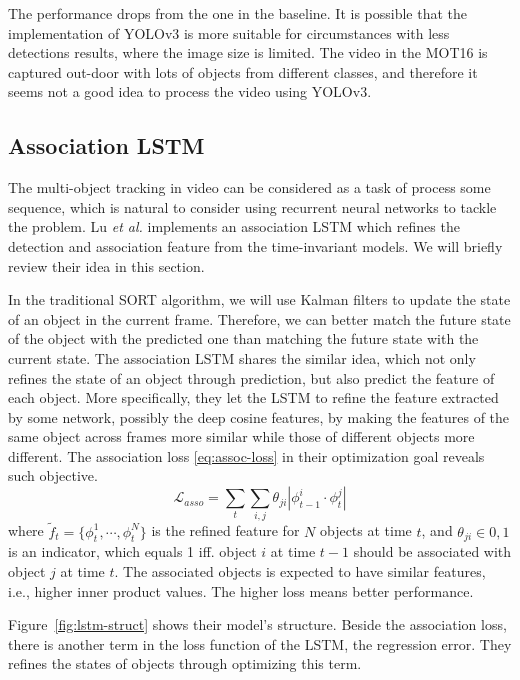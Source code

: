 \documentclass[conference]{IEEEtran}
\begin{document}
The performance drops from the one in the baseline.
It is possible that the implementation of YOLOv3 is more suitable for circumstances with less detections results, where the image size is limited.
The video in the MOT16 is captured out-door with lots of objects from different classes, and therefore it seems not a good idea to process the video using YOLOv3.

\subsection{Association LSTM}
The multi-object tracking in video can be considered as a task of process some sequence, which is natural to consider using recurrent neural networks to tackle the problem.
Lu \textit{et al.} \cite{lu2017online} implements an association LSTM which refines the detection and association feature from the time-invariant models.
We will briefly review their idea in this section.

In the traditional SORT algorithm, we will use Kalman filters to update the state of an object in the current frame.
Therefore, we can better match the future state of the object with the predicted one than matching the future state with the current state.
The association LSTM shares the similar idea, which not only refines the state of an object through prediction, but also predict the feature of each object.
More specifically, they let the LSTM to refine the feature extracted by some network, possibly the deep cosine features, by making the features of the same object across frames more similar while those of different objects more different.
The association loss \eqref{eq:assoc-loss} in their optimization goal reveals such objective.
\begin{equation}
    \mathcal{L}_{asso} = \sum_t \sum_{i,j} \theta_{ji}|\phi_{t-1}^i \cdot \phi_t^j|
    \label{eq:assoc-loss}
\end{equation}
where $\tilde{f}_t = \{\phi_t^1, \cdots, \phi_t^N\}$ is the refined feature for $N$ objects at time $t$, and $\theta_{ji} \in 0, 1$ is an indicator, which equals 1 iff. object $i$ at time $t-1$ should be associated with object $j$ at time $t$.
The associated objects is expected to have similar features, i.e., higher inner product values.
The higher loss means better performance.

Figure~\ref{fig:lstm-struct} shows their model's structure.
Beside the association loss, there is another term in the loss function of the LSTM, the regression error.
They refines the states of objects through optimizing this term.
\end{document}
